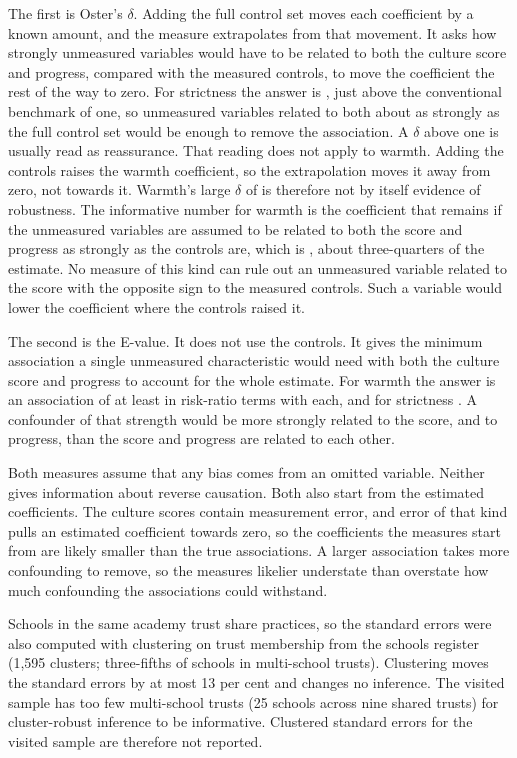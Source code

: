 The first is Oster's $\delta$. Adding the full control set moves each coefficient by a known amount, and the measure extrapolates from that movement. It asks how strongly unmeasured variables would have to be related to both the culture score and progress, compared with the measured controls, to move the coefficient the rest of the way to zero. For strictness the answer is \OsterDeltaS{}, just above the conventional benchmark of one, so unmeasured variables related to both about as strongly as the full control set would be enough to remove the association. A $\delta$ above one is usually read as reassurance. That reading does not apply to warmth. Adding the controls raises the warmth coefficient, so the extrapolation moves it away from zero, not towards it. Warmth's large $\delta$ of \OsterDeltaW{} is therefore not by itself evidence of robustness. The informative number for warmth is the coefficient that remains if the unmeasured variables are assumed to be related to both the score and progress as strongly as the controls are, which is \OsterBetaEqualW{}, about three-quarters of the estimate. No measure of this kind can rule out an unmeasured variable related to the score with the opposite sign to the measured controls. Such a variable would lower the coefficient where the controls raised it.

The second is the E-value. It does not use the controls. It gives the minimum association a single unmeasured characteristic would need with both the culture score and progress to account for the whole estimate. For warmth the answer is an association of at least \EValW{} in risk-ratio terms with each, and for strictness \EValS{}. A confounder of that strength would be more strongly related to the score, and to progress, than the score and progress are related to each other.

Both measures assume that any bias comes from an omitted variable. Neither gives information about reverse causation. Both also start from the estimated coefficients. The culture scores contain measurement error, and error of that kind pulls an estimated coefficient towards zero, so the coefficients the measures start from are likely smaller than the true associations. A larger association takes more confounding to remove, so the measures likelier understate than overstate how much confounding the associations could withstand.

Schools in the same academy trust share practices, so the standard errors were also computed with clustering on trust membership from the schools register (1,595 clusters; three-fifths of schools in multi-school trusts). Clustering moves the standard errors by at most 13 per cent and changes no inference. The visited sample has too few multi-school trusts (25 schools across nine shared trusts) for cluster-robust inference to be informative. Clustered standard errors for the visited sample are therefore not reported.


